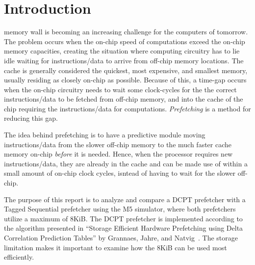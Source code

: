 \section{Introduction}

 memory wall is becoming an increasing challenge for the
computers of tomorrow. The problem occurs when the on-chip speed of computations
exceed the on-chip memory capacities, creating the situation where computing
circuitry has to lie idle waiting for instructions/data to arrive from off-chip
memory locations. The cache is generally considered the quickest, most
expensive, and smallest memory, usually residing as closely on-chip as possible.
Because of this, a time-gap occurs when the on-chip circuitry needs to wait some
clock-cycles for the the correct instructions/data to be fetched from off-chip
memory, and into the cache of the chip requiring the instructions/data for
computations. \emph{Prefetching} is a method for reducing this gap.

The idea behind prefetching is to have a predictive module moving
instructions/data from the slower off-chip memory to the much faster cache
memory on-chip \emph{before} it is needed. Hence, when the processor requires
new instructions/data, they are already in the cache and can be made use of
within a small amount of on-chip clock cycles, isntead of having to wait for the
slower off-chip.

The purpose of this report is to analyze and compare a DCPT prefetcher with a
Tagged Sequential prefetcher using the M5 simulator, where both prefetchers
utilize a maximum of 8KiB. The DCPT prefetcher is implemented according to the
algorithm presented in ``Storage Efficient Hardware Prefetching using Delta
Correlation Prediction Tables'' by Grannaes, Jahre, and Natvig~\cite{dcpt}. The
storage limitation makes it important to examine how the 8KiB can be used most
efficiently.



